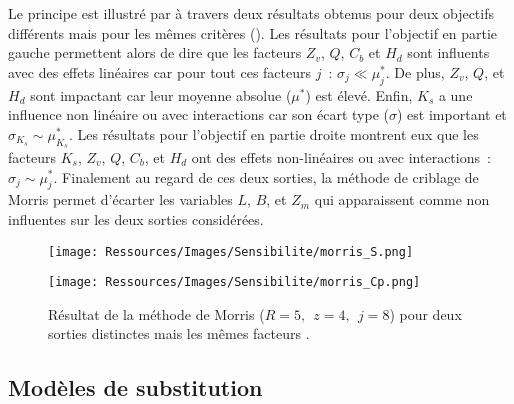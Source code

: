 Le principe est illustré par \textcite{Iooss2011} à travers deux résultats obtenus
pour deux objectifs différents mais pour les mêmes critères ().
Les résultats pour l’objectif en partie gauche permettent alors de dire que
les facteurs $Z_{v}$, $Q$, $C_{b}$ et $H_{d}$ sont influents
avec des effets linéaires car pour tout ces facteurs $j$~: $\sigma_{j} \ll \mu^{*}_{j}$.
De plus, $Z_{v}$, $Q$, et $H_{d}$ sont impactant car leur moyenne absolue ($\mu^{*}$) est élevé.
Enfin, $K_{s}$ a une influence non linéaire ou avec interactions car son écart type ($\sigma$)
est important et  $\sigma_{K_{s}} \sim \mu^{*}_{K_{s}}$.
Les résultats pour l’objectif en partie droite montrent eux que les facteurs $K_{s}$, $Z_{v}$, $Q$, $C_{b}$,
et $H_{d}$ ont des effets non-linéaires ou avec interactions~: $\sigma_{j} \sim
\mu^{*}_{j}$. Finalement au regard de ces deux sorties, la méthode de criblage de Morris
permet d’écarter les variables $L$, $B$, et $Z_{m}$ qui apparaissent comme non influentes
sur les deux sorties considérées.

\begin{figure}
    \centering
    \begin{minipage}{.45\textwidth}
      \texttt{[image: Ressources/Images/Sensibilite/morris\_S.png]}
    \end{minipage}
    \hfill
    \begin{minipage}{.45\textwidth}
      \texttt{[image: Ressources/Images/Sensibilite/morris\_Cp.png]}
    \end{minipage}
  \caption[Exemple de résultats de la méthode de Morris]
          {Résultat de la méthode de Morris ($R = 5,~~ z = 4,~~ j=8$) pour deux
           sorties distinctes mais les mêmes facteurs \parencite{Iooss2011}.}
  \label{fig:meth_graph_morris}
\end{figure}



\subsection{Modèles de substitution} %
\label{sub:modeles_de_substitution}
